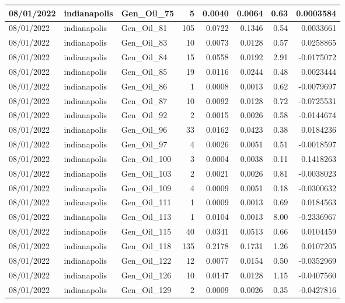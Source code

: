 \documentclass[
  letterpaper,
  DIV=11,
  numbers=noendperiod]{scrartcl}
\begin{document}
\begin{tabular}{l|l|l|r|r|r|r|r}
\hline
08/01/2022 & indianapolis & Gen\_Oil\_75 & 5 & 0.0040 & 0.0064 & 0.63 & 0.0003584\\
\hline
08/01/2022 & indianapolis & Gen\_Oil\_81 & 105 & 0.0722 & 0.1346 & 0.54 & 0.0033661\\
\hline
08/01/2022 & indianapolis & Gen\_Oil\_83 & 10 & 0.0073 & 0.0128 & 0.57 & 0.0258865\\
\hline
08/01/2022 & indianapolis & Gen\_Oil\_84 & 15 & 0.0558 & 0.0192 & 2.91 & -0.0175072\\
\hline
08/01/2022 & indianapolis & Gen\_Oil\_85 & 19 & 0.0116 & 0.0244 & 0.48 & 0.0023444\\
\hline
08/01/2022 & indianapolis & Gen\_Oil\_86 & 1 & 0.0008 & 0.0013 & 0.62 & -0.0079697\\
\hline
08/01/2022 & indianapolis & Gen\_Oil\_87 & 10 & 0.0092 & 0.0128 & 0.72 & -0.0725531\\
\hline
08/01/2022 & indianapolis & Gen\_Oil\_92 & 2 & 0.0015 & 0.0026 & 0.58 & -0.0144674\\
\hline
08/01/2022 & indianapolis & Gen\_Oil\_96 & 33 & 0.0162 & 0.0423 & 0.38 & 0.0184236\\
\hline
08/01/2022 & indianapolis & Gen\_Oil\_97 & 4 & 0.0026 & 0.0051 & 0.51 & -0.0018597\\
\hline
08/01/2022 & indianapolis & Gen\_Oil\_100 & 3 & 0.0004 & 0.0038 & 0.11 & 0.1418263\\
\hline
08/01/2022 & indianapolis & Gen\_Oil\_103 & 2 & 0.0021 & 0.0026 & 0.81 & -0.0038023\\
\hline
08/01/2022 & indianapolis & Gen\_Oil\_109 & 4 & 0.0009 & 0.0051 & 0.18 & -0.0300632\\
\hline
08/01/2022 & indianapolis & Gen\_Oil\_111 & 1 & 0.0009 & 0.0013 & 0.69 & 0.0184563\\
\hline
08/01/2022 & indianapolis & Gen\_Oil\_113 & 1 & 0.0104 & 0.0013 & 8.00 & -0.2336967\\
\hline
08/01/2022 & indianapolis & Gen\_Oil\_115 & 40 & 0.0341 & 0.0513 & 0.66 & 0.0104459\\
\hline
08/01/2022 & indianapolis & Gen\_Oil\_118 & 135 & 0.2178 & 0.1731 & 1.26 & 0.0107205\\
\hline
08/01/2022 & indianapolis & Gen\_Oil\_122 & 12 & 0.0077 & 0.0154 & 0.50 & -0.0352969\\
\hline
08/01/2022 & indianapolis & Gen\_Oil\_126 & 10 & 0.0147 & 0.0128 & 1.15 & -0.0407560\\
\hline
08/01/2022 & indianapolis & Gen\_Oil\_129 & 2 & 0.0009 & 0.0026 & 0.35 & -0.0427816\\

\end{tabular}
\end{document}
